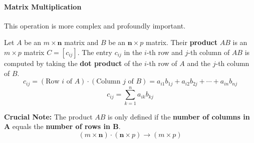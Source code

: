 \documentclass[oneside]{book}
\begin{document}
\newpage

\paragraph{Matrix Multiplication}
This operation is more complex and profoundly important.

\begin{definition}
Let $A$ be an $m \times \mathbf{n}$ matrix and $B$ be an $\mathbf{n} \times p$ matrix. Their \textbf{product} $AB$ is an $m \times p$ matrix $C = [c_{ij}]$.
The entry $c_{ij}$ in the $i$-th row and $j$-th column of $AB$ is computed by taking the \textbf{dot product} of the $i$-th row of $A$ and the $j$-th column of $B$.
\[ c_{ij} = (\text{Row } i \text{ of } A) \cdot (\text{Column } j \text{ of } B) = a_{i1}b_{1j} + a_{i2}b_{2j} + \cdots + a_{in}b_{nj} \]
\[ c_{ij} = \sum_{k=1}^{n} a_{ik}b_{kj} \]
\end{definition}

\textbf{Crucial Note:} The product $AB$ is only defined if the \textbf{number of columns in A} equals the \textbf{number of rows in B}.
\[
(m \times \mathbf{n}) \cdot (\mathbf{n} \times p) \to (m \times p)
\]
\end{document}
